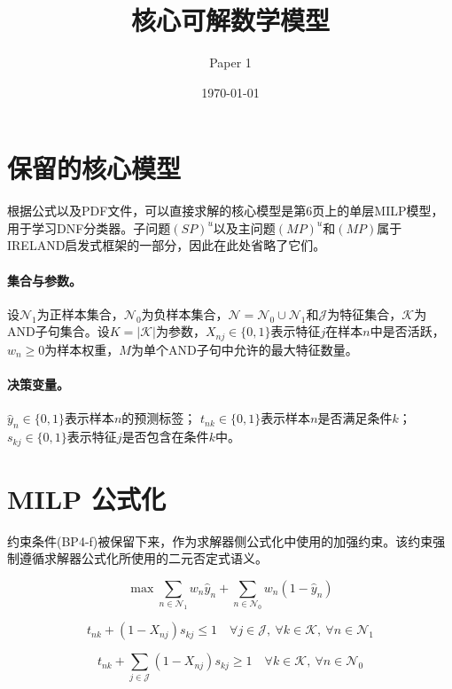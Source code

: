 \documentclass{article}
\title{核心可解数学模型}
\author{Paper 1}
\date{\today}
\begin{document}
\maketitle

\section*{保留的核心模型}
根据\texttt{}公式以及PDF文件，可以直接求解的核心模型是第6页上的单层MILP模型，用于学习DNF分类器。子问题$(SP)^u$以及主问题$(MP)^u$和$(MP)$属于IRELAND启发式框架的一部分，因此在此处省略了它们。

\paragraph{集合与参数。}
设$\mathcal{N}_1$为正样本集合，$\mathcal{N}_0$为负样本集合，$\mathcal{N}=\mathcal{N}_0 \cup \mathcal{N}_1$和$\mathcal{J}$为特征集合，$\mathcal{K}$为AND子句集合。设$K = |\mathcal{K}|$为参数，$X_{nj}\in\{0,1\}$表示特征$j$在样本$n$中是否活跃，$w_n \ge 0$为样本权重，$M$为单个AND子句中允许的最大特征数量。

\paragraph{决策变量。}
$\hat{y}_n \in \{0,1\}$表示样本$n$的预测标签；  
$t_{nk} \in \{0,1\}$表示样本$n$是否满足条件$k$；  
$s_{kj} \in \{0,1\}$表示特征$j$是否包含在条件$k$中。

\section*{MILP 公式化}
约束条件\textup{(BP4-f)}被保留下来，作为求解器侧公式化中使用的加强约束。该约束强制遵循求解器公式化所使用的二元否定式语义。

\begin{equation}
\max \sum_{n \in \mathcal{N}_1} w_n \hat{y}_n
+ \sum_{n \in \mathcal{N}_0} w_n (1 - \hat{y}_n)
\tag{BP4-Obj}
\end{equation}

\begin{equation}
t_{nk} + (1 - X_{nj}) s_{kj} \le 1
\quad \forall j \in \mathcal{J},\ \forall k \in \mathcal{K},\ \forall n \in \mathcal{N}_1
\tag{BP4-a}
\end{equation}

\begin{equation}
t_{nk} + \sum_{j \in \mathcal{J}} (1 - X_{nj}) s_{kj} \ge 1
\quad \forall k \in \mathcal{K},\ \forall n \in \mathcal{N}_0
\tag{BP4-b}
\end{equation}
\end{document}

